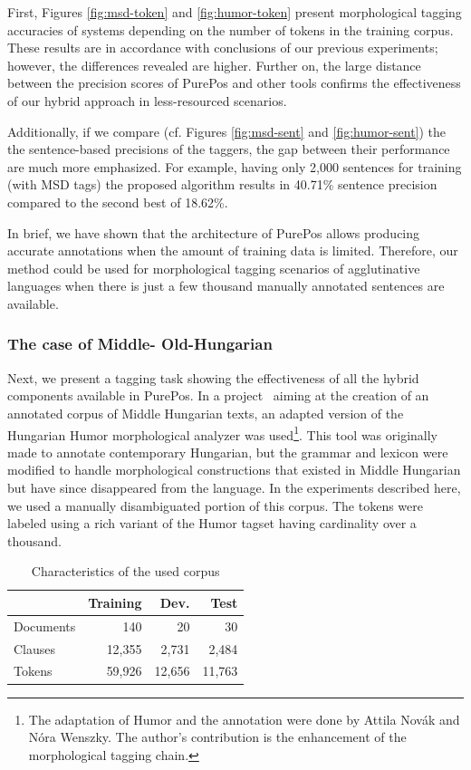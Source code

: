 First, Figures \ref{fig:msd-token} and \ref{fig:humor-token} present morphological tagging accuracies of systems depending on the number of tokens in the training corpus. 
These results are in accordance with conclusions of our previous experiments; however, the differences revealed are higher. 
Further on, the large distance between the precision scores of PurePos and other tools confirms the effectiveness of our  hybrid approach in less-resourced scenarios.


Additionally, if we compare (cf. Figures \ref{fig:msd-sent} and \ref{fig:humor-sent}) the the sentence-based precisions of the taggers, the gap between their performance are much more emphasized. 
For example, having only 2,000 sentences for training (with MSD tags) the proposed algorithm results in 40.71\% sentence precision compared to the second best of 18.62\%.

In brief, we have shown that the architecture of PurePos allows producing accurate annotations when the amount of training data is limited. Therefore, our method could be used for morphological tagging scenarios of agglutinative languages when there is just a few thousand manually annotated sentences are available.

\subsubsection{The case of Middle- Old-Hungarian}
\label{sec:oldhungarian}

Next, we present a tagging task showing the effectiveness of all the hybrid components available in PurePos. 
In a project~\cite{NovakOMK,Novak2013} aiming at the creation of an annotated corpus of Middle Hungarian texts, an adapted version of the Hungarian Humor morphological analyzer \cite{NovakOMK} was used\footnote{The adaptation of Humor and the annotation were done by  Attila Novák and Nóra Wenszky. The author's contribution is the enhancement of the morphological tagging chain.}. 
This tool was originally made to annotate contemporary Hungarian, but the grammar and lexicon were modified to handle morphological constructions that existed in Middle Hungarian but have since disappeared from the language. 
In the experiments described here, we used a manually disambiguated portion of this corpus. The tokens were labeled using a rich variant of the Humor tagset having cardinality over a thousand.

\begin{table}[H]
\centering
\caption{Characteristics of the used corpus}\label{tab:oldhun-corpus}
\begin{tabular}{l r r r}
\hline
& Training & Dev. & Test \\
\hline
Documents & 140 & 20 & 30 \\
Clauses & 12,355 & 2,731 & 2,484 \\
Tokens & 59,926 & 12,656 &  11,763\\
\hline
\end{tabular}
\end{table}

